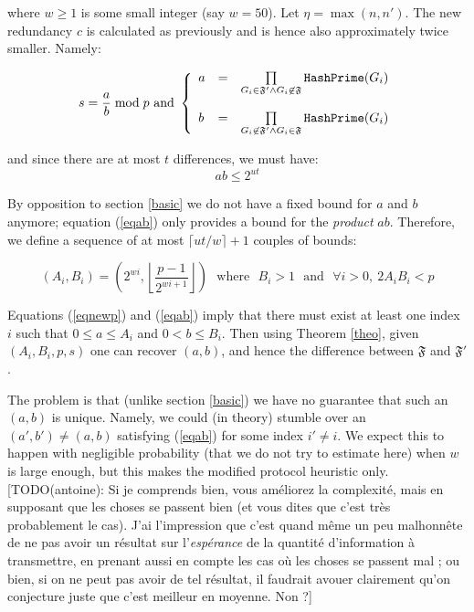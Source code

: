 \documentclass[11pt]{llncs}
\begin{document}
where $w \geq 1$ is some small integer (say $w=50$). Let $\eta=\max(n,n')$. The new redundancy $c$ is calculated as previously and is hence also approximately twice smaller. Namely:

$$s=\frac{a}{b} \bmod p \mbox{~and~}
\left\{
\begin{array}{lcr}
a & =&  \prod\limits_{G_i \in \mathfrak{F}'\wedge G_i \not\in\mathfrak{F}} \mbox{{\tt HashPrime}}(G_i) \\
\\
b & = & \prod\limits_{G_i \not\in\mathfrak{F}' \wedge G_i \in\mathfrak{F}} \mbox{{\tt HashPrime}}(G_i)
\end{array}
\right.
$$

and since there are at most $t$ differences, we must have:
\begin{equation}
\label{eqab}
a b \leq 2^{ut}
\end{equation}

By opposition to section \ref{basic} we do not have a fixed bound for $a$ and $b$ anymore; equation (\ref{eqab}) only provides a bound for the {\sl product} $a b$. Therefore, we define a sequence of at most $\lceil ut/w \rceil+1$ couples of bounds:

$$\left(A_i,B_i\right)=\left(2^{wi},\left\lfloor \frac{p-1}{2^{wi+1}} \right\rfloor\right)\mbox{~~where~~}B_i>1\mbox{~~and~~}\forall i>0,~2 A_i B_i<p$$

Equations (\ref{eqnewp}) and (\ref{eqab}) imply that there must exist at least one index $i$ such that $0 \leq a \leq A_i$ and $0 <b \leq B_i$. Then using Theorem \ref{theo}, given $(A_i,B_i,p,s)$ one can recover $(a,b)$, and hence the difference between $\mathfrak{F}$ and $\mathfrak{F}'$.\smallskip

The problem is that (unlike section \ref{basic}) we have no guarantee that such an $(a,b)$ is unique. Namely, we could (in theory) stumble over an $(a',b')\neq (a,b)$ satisfying (\ref{eqab}) for some index $i' \neq i$. We expect this to happen with negligible probability (that we do not try to estimate here) when $w$ is large enough, but this makes the modified protocol heuristic only. [TODO(antoine): Si je comprends bien, vous améliorez la complexité, mais en supposant que les choses se passent bien (et vous dites que c'est très probablement le cas). J'ai l'impression que c'est quand même un peu malhonnête de ne pas avoir un résultat sur l'\emph{espérance} de la quantité d'information à transmettre, en prenant aussi en compte les cas où les choses se passent mal ; ou bien, si on ne peut pas avoir de tel résultat, il faudrait avouer clairement qu'on conjecture juste que c'est meilleur en moyenne. Non ?] \smallskip
\end{document}
